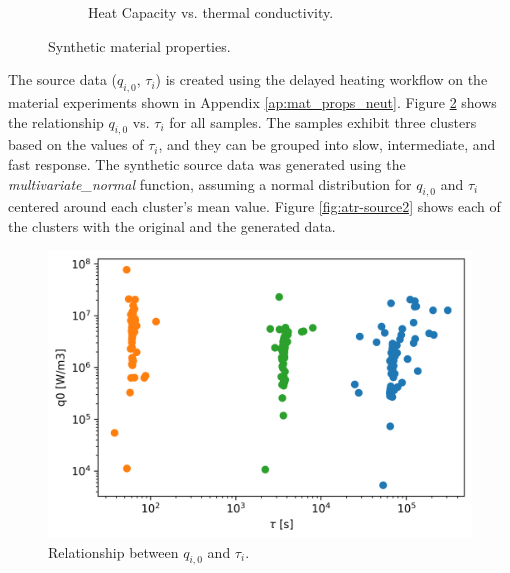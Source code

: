\begin{figure}[htbp!]
\begin{subfigure}[b]{0.49\textwidth}
    \caption{Heat Capacity vs. thermal conductivity.}
  \end{subfigure}
  \caption{Synthetic material properties.}
  \label{fig:atr-syn-mats-1}
\end{figure}

The source data ($q_{i,0}$, $\tau_i$) is created using the delayed heating workflow on the material experiments shown in Appendix \ref{ap:mat_props_neut}.
Figure \ref{fig:atr-source1} shows the relationship $q_{i,0}$ vs. $\tau_i$ for all samples.
The samples exhibit three clusters based on the values of $\tau_i$, and they can be grouped into slow, intermediate, and fast response.
The synthetic source data was generated using the \textit{multivariate\_normal} function, assuming a normal distribution for $q_{i,0}$ and $\tau_i$ centered around each cluster's mean value.
Figure \ref{fig:atr-source2} shows each of the clusters with the original and the generated data.

\begin{figure}[htbp!] %
  \centering
  \includegraphics[width=0.45\linewidth]{figures/q0_vs_tau}
  \hfill
  \caption{Relationship between $q_{i,0}$ and $\tau_i$.}
  \label{fig:atr-source1}
\end{figure}

